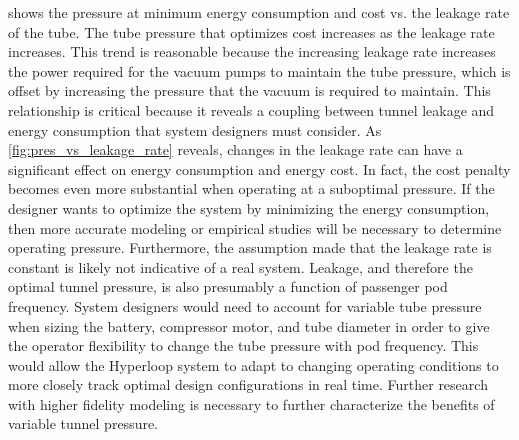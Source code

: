  shows the pressure at minimum energy
consumption and cost vs. the leakage rate of the tube. The tube pressure that optimizes
cost increases as the leakage rate increases. This trend is reasonable because the
increasing leakage rate increases the power required for the vacuum pumps to
maintain the tube pressure, which is offset by increasing the pressure that the
vacuum is required to maintain. This relationship is critical because it
reveals a coupling between tunnel leakage and energy consumption that system
designers must consider. As \cref{fig:pres_vs_leakage_rate} reveals, changes
in the leakage rate can have a significant effect on energy consumption and energy cost.
In fact, the cost penalty becomes even more substantial when
operating at a suboptimal pressure. If the designer wants to optimize the
system by minimizing the energy consumption, then more accurate modeling or
empirical studies will be necessary to determine operating pressure.
Furthermore, the assumption made that the leakage rate is constant is
likely not indicative of a real system. Leakage, and therefore the optimal
tunnel pressure, is also presumably a function of passenger pod frequency.
System designers would need to account for variable tube pressure
when sizing the battery, compressor motor, and tube diameter in order to give
the operator flexibility to change the tube pressure with pod frequency.
This would allow the Hyperloop system to adapt to changing operating conditions
to more closely track optimal design configurations in real time.
Further research with higher fidelity modeling is necessary to further
characterize the benefits of variable tunnel pressure.
